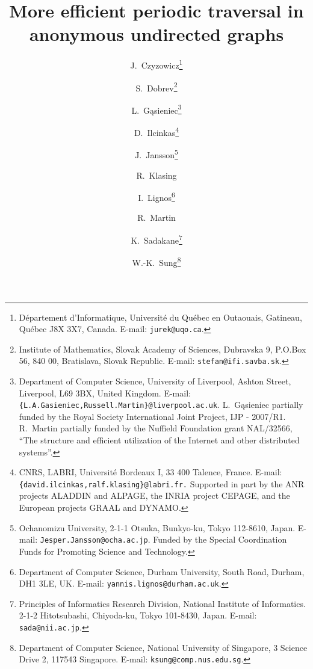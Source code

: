 \documentclass[11pt,envcountsame,oribibl]{llncs}
\begin{document}
\title{{More efficient periodic traversal in anonymous undirected graphs}}
\author{
J.~Czyzowicz\thanks{\tiny D\'epartement d'Informatique,
                          Universit\'e du Qu\'ebec en Outaouais,
                          Gatineau, Qu\'ebec J8X 3X7, Canada.
                          E-mail: {\tt jurek@uqo.ca}.}
\and
S.~Dobrev\thanks{\tiny Institute of Mathematics,
                       Slovak Academy of Sciences,
                       Dubravska 9, P.O.Box 56, 840 00,
                       Bratislava, Slovak Republic.
                       E-mail: {\tt stefan@ifi.savba.sk}.}
\and
L.~G\k{a}sieniec\thanks{\tiny Department of Computer Science,
                              University of Liverpool,
                              Ashton Street, Liverpool, L69 3BX, United Kingdom.
                              E-mail: {\tt \{L.A.Gasieniec,Russell.Martin\}@liverpool.ac.uk}.
                              L.~G\k{a}sieniec partially funded by the
                              Royal Society International Joint Project, IJP - 2007/R1.
                              R.~Martin partially funded by the Nuffield Foundation
                              grant NAL/32566, ``The structure and efficient
                              utilization of the Internet and other distributed systems''.}
\and
D.~Ilcinkas\thanks{\tiny CNRS, LABRI, Universit\'e Bordeaux I,
                         33 400 Talence, France.
                         E-mail: {\tt \{david.ilcinkas,ralf.klasing\}@labri.fr.}
                         Supported in part by the ANR projects ALADDIN and ALPAGE,
                         the INRIA project CEPAGE,
                         and the European projects GRAAL and DYNAMO.}
\and
J.~Jansson\thanks{\tiny Ochanomizu University, 2-1-1 Otsuka,
                        Bunkyo-ku, Tokyo 112-8610, Japan.
                        E-mail: \texttt{Jesper.Jansson@ocha.ac.jp}.
                        Funded by the Special Coordination Funds for
                        Promoting Science and Technology.}
\and
R.~Klasing
\and
I.~Lignos\thanks{\tiny Department of Computer Science,
                       Durham University, South Road, Durham, DH1 3LE, UK.
                       E-mail: {\tt yannis.lignos@durham.ac.uk}.}
\and
R.~Martin\and
K.~Sadakane\thanks{\tiny Principles of Informatics Research Division,
                         National Institute of Informatics.
                         2-1-2 Hitotsubashi, Chiyoda-ku, Tokyo 101-8430, Japan.
                         E-mail: {\tt sada@nii.ac.jp}.}
\and
W.-K.~Sung\thanks{\tiny Department of Computer Science,
                        National University of Singapore,
                        3 Science Drive 2, 117543 Singapore.
                        E-mail: {\tt ksung@comp.nus.edu.sg}.}
}
\end{document}

